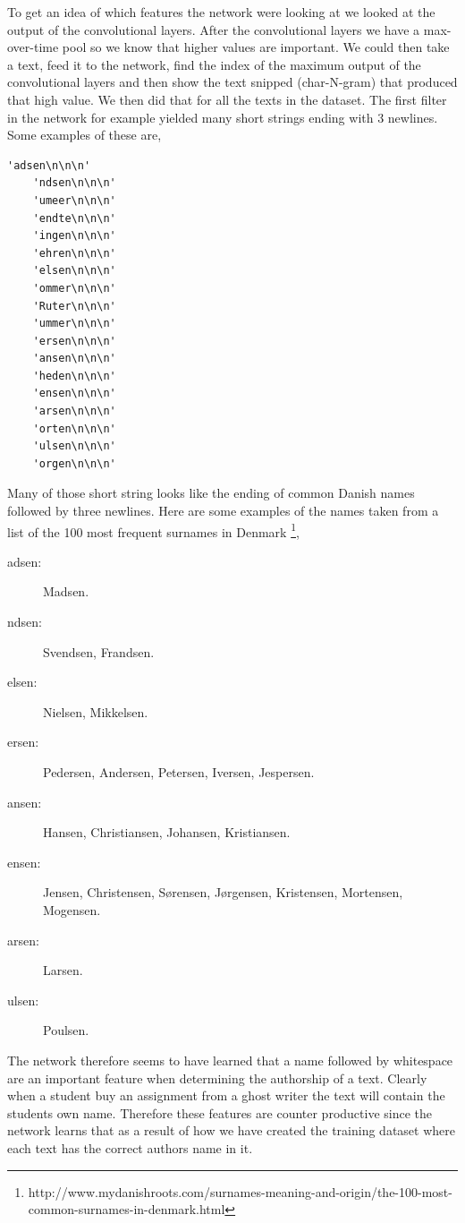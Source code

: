 To get an idea of which features the network were looking at we looked at the
output of the convolutional layers. After the convolutional layers we have a
max-over-time pool so we know that higher values are important. We could then
take a text, feed it to the network, find the index of the maximum output of
the convolutional layers and then show the text snipped (char-N-gram) that
produced that high value. We then did that for all the texts in the dataset. The
first filter in the network for example yielded many short strings ending with 3
newlines. Some examples of these are,

\begin{lstlisting}[gobble=4]
    'adsen\n\n\n'
    'ndsen\n\n\n'
    'umeer\n\n\n'
    'endte\n\n\n'
    'ingen\n\n\n'
    'ehren\n\n\n'
    'elsen\n\n\n'
    'ommer\n\n\n'
    'Ruter\n\n\n'
    'ummer\n\n\n'
    'ersen\n\n\n'
    'ansen\n\n\n'
    'heden\n\n\n'
    'ensen\n\n\n'
    'arsen\n\n\n'
    'orten\n\n\n'
    'ulsen\n\n\n'
    'orgen\n\n\n'
\end{lstlisting}

Many of those short string looks like the ending of common Danish
names followed by three newlines. Here are some examples of the
names taken from a list of the 100 most frequent surnames in Denmark
\footnote{http://www.mydanishroots.com/surnames-meaning-and-origin/the-100-most-
common-surnames-in-denmark.html},

\begin{description}
    \item[adsen:] Madsen.
    \item[ndsen:] Svendsen, Frandsen.
    \item[elsen:] Nielsen, Mikkelsen.
    \item[ersen:] Pedersen, Andersen, Petersen, Iversen, Jespersen.
    \item[ansen:] Hansen, Christiansen, Johansen, Kristiansen.
    \item[ensen:] Jensen, Christensen, S\o rensen, J\o rgensen, Kristensen,
        Mortensen, Mogensen.
    \item[arsen:] Larsen.
    \item[ulsen:] Poulsen.
\end{description}

The network therefore seems to have learned that a name followed by whitespace
are an important feature when determining the authorship of a text. Clearly when
a student buy an assignment from a ghost writer the text will contain the
students own name. Therefore these features are counter productive since the
network learns that as a result of how we have created the training dataset
where each text has the correct authors name in it.


